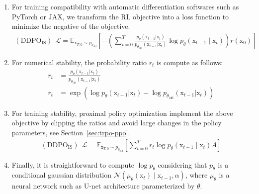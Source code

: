 \begin{enumerate}
  \item For training compatibility with automatic differentiation softwares such as PyTorch or JAX, we transform the RL objective into a loss function to minimize the negative of the objective.
  \begin{equation*}
    \begin{split}
      (\text{DDPO}_{\text{IS}})~~ \mathcal{L} = \mathbb{E}_{\mathrm{x}_{T:0}\sim p_{\theta_{\text{old}}}} \left[-\left(\sum_{t=0}^{T}\frac{p_{\theta}(\mathrm{x}_{t-1}|\mathrm{x}_{t})}{p_{\theta_{\text{old}}}(\mathrm{x}_{t-1}|\mathrm{x}_{t})} \log p_{\theta}(\mathrm{x}_{t-1}\mid\mathrm{x}_{t})\right) r(\mathrm{x}_{0}) \right]
    \end{split}
  \end{equation*}
  \item For numerical stability, the probability ratio $r_{t}$ is compute as follows:
  \begin{equation*}
    \begin{split}
      r_{t} &= \frac{p_{\theta}(\mathrm{x}_{t-1}|\mathrm{x}_{t})}{p_{\theta_{\text{old}}}(\mathrm{x}_{t-1}|\mathrm{x}_{t})} \\
      r_{t} &= \exp(\log p_{\theta}(\mathrm{x}_{t-1}|\mathrm{x}_{t}) - \log p_{\theta_{\text{old}}}(\mathrm{x}_{t-1}|\mathrm{x}_{t}))
    \end{split}
  \end{equation*}
  \item For training stability, proximal policy optimization implement the above objective by clipping the ratios and avoid large changes in the policy parameters, see Section~\ref{sec:trpo-ppo}. 
  \begin{equation*}
    \begin{split}
      (\text{DDPO}_{\text{IS}})~~ \mathcal{L} =  \mathbb{E}_{\mathrm{x}_{T:0}\sim p_{\theta_{\text{old}}}} \left[ \sum_{t=0}^{T}r_{t} \log p_{\theta}(\mathrm{x}_{t-1}\mid \mathrm{x}_{t}) A \right]
    \end{split}
  \end{equation*}
  \item Finally, it is straightforward to compute $\log p_{\theta}$ considering that $p_{\theta}$ is a conditional gaussian distribution 
  $\mathcal{N}(\mu_{\theta}(\mathrm{x}_{t})\mid\mathrm{x}_{t-1}, \alpha)$, where
  $\mu_{\theta}$ is a neural network such as U-net architecture parameterized by $\theta$. 
\end{enumerate}

